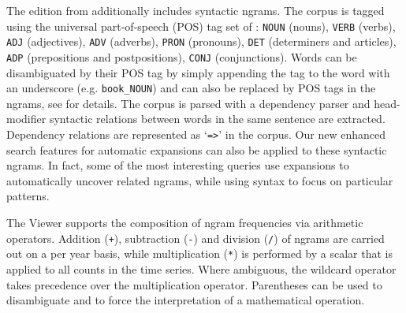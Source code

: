 \documentclass[11pt,a4paper]{article}
\newcommand{\query}[1]{\texttt{#1}}
\begin{document}
The edition from  additionally includes syntactic ngrams. The corpus is tagged using the universal part-of-speech (POS) tag set of : \query{NOUN} (nouns), \query{VERB} (verbs), \query{ADJ} (adjectives), \query{ADV} (adverbs), \query{PRON} (pronouns), \query{DET} (determiners and articles), \query{ADP} (prepositions and postpositions), \query{CONJ} (conjunctions). Words can be disambiguated by their POS tag by simply appending the tag to the word with an underscore (e.g. \texttt{book\_NOUN}) and can also be replaced by POS tags in the ngrams, see  for details. The corpus is  parsed with a dependency parser and head-modifier syntactic relations between words in the same sentence are extracted. Dependency relations are represented as `\query{=>}' in the corpus. Our new enhanced search features for automatic expansions can also be applied to these syntactic ngrams. In fact, some of the most interesting queries use expansions to automatically uncover related ngrams, while using syntax to focus on particular patterns.

The Viewer supports the composition of ngram frequencies via arithmetic operators. Addition (\query{+}), subtraction (\query{-}) and division (\query{/}) of ngrams are carried out on a per year basis, while multiplication (\query{*}) is performed by a scalar that is applied to all counts in the time series. Where ambiguous, the wildcard operator takes precedence over the multiplication operator. Parentheses can be used to disambiguate and to force the interpretation of a mathematical operation.
\end{document}
